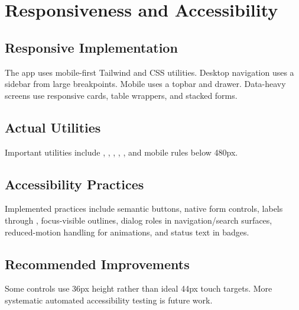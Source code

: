 \chapter{Responsiveness and Accessibility}
\section{Responsive Implementation}
The app uses mobile-first Tailwind and CSS utilities. Desktop navigation uses a sidebar from large breakpoints. Mobile uses a topbar and drawer. Data-heavy screens use responsive cards, table wrappers, and stacked forms.

\section{Actual Utilities}
Important utilities include , , , , , and mobile rules below 480px.

\section{Accessibility Practices}
Implemented practices include semantic buttons, native form controls, labels through , focus-visible outlines, dialog roles in navigation/search surfaces, reduced-motion handling for animations, and status text in badges.

\section{Recommended Improvements}
Some controls use 36px height rather than ideal 44px touch targets. More systematic automated accessibility testing is future work.
